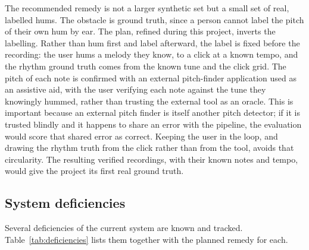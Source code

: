 \documentclass[12pt,a4paper]{article}
\begin{document}
The recommended remedy is not a larger synthetic set but a small set of real,
labelled hums. The obstacle is ground truth, since a person cannot label the
pitch of their own hum by ear. The plan, refined during this project, inverts
the labelling. Rather than hum first and label afterward, the label is fixed
before the recording: the user hums a melody they know, to a click at a known
tempo, and the rhythm ground truth comes from the known tune and the click
grid. The pitch of each note is confirmed with an external pitch-finder
application used as an assistive aid, with the user verifying each note against
the tune they knowingly hummed, rather than trusting the external tool as an
oracle. This is important because an external pitch finder is itself another
pitch detector; if it is trusted blindly and it happens to share an error with
the pipeline, the evaluation would score that shared error as correct. Keeping
the user in the loop, and drawing the rhythm truth from the click rather than
from the tool, avoids that circularity. The resulting verified recordings, with
their known notes and tempo, would give the project its first real ground truth.

\subsection{System deficiencies}

Several deficiencies of the current system are known and tracked.
Table~\ref{tab:deficiencies} lists them together with the planned remedy for
each.
\end{document}
